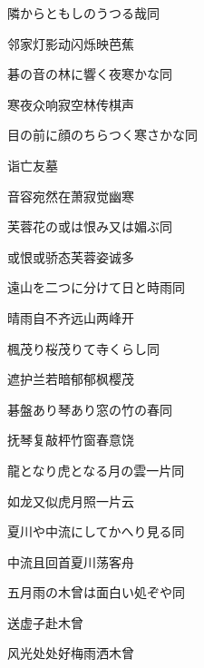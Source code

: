 \begin{haiku}
    {\FH 隣からともしのうつる哉}\hfill{\FH 同}

    {\FK 邻家灯影动闪烁映芭蕉}
\end{haiku}

\begin{haiku}
    {\FH 碁の音の林に響く夜寒かな}\hfill{\FH 同}

    {\FK 寒夜众响寂空林传棋声}
\end{haiku}

\begin{haiku}
    {\FH 目の前に顔のちらつく寒さかな}\hfill{\FH 同}

    {\FK 诣亡友墓}

    {\FK 音容宛然在萧寂觉幽寒}
\end{haiku}

\begin{haiku}
    {\FH 芙蓉花の或は恨み又は媚ぶ}\hfill{\FH 同}

    {\FK 或恨或骄态芙蓉姿诚多}
\end{haiku}

\begin{haiku}
    {\FH 遠山を二つに分けて日と時雨}\hfill{\FH 同}

    {\FK 晴雨自不齐远山两峰开}
\end{haiku}

\begin{haiku}
    {\FH 楓茂り桜茂りて寺くらし}\hfill{\FH 同}

    {\FK 遮护兰若暗郁郁枫樱茂}
\end{haiku}

\begin{haiku}
    {\FH 碁盤あり琴あり窓の竹の春}\hfill{\FH 同}

    {\FK 抚琴复敲枰竹窗春意饶}
\end{haiku}

\begin{haiku}
    {\FH 龍となり虎となる月の雲一片}\hfill{\FH 同}

    {\FK 如龙又似虎月照一片云}
\end{haiku}

\begin{haiku}
    {\FH 夏川や中流にしてかへり見る}\hfill{\FH 同}

    {\FK 中流且回首夏川荡客舟}
\end{haiku}

\begin{haiku}
    {\FH 五月雨の木曾は面白い処ぞや}\hfill{\FH 同}

    {\FK 送虚子赴木曾}

    {\FK 风光处处好梅雨洒木曾}
\end{haiku}

